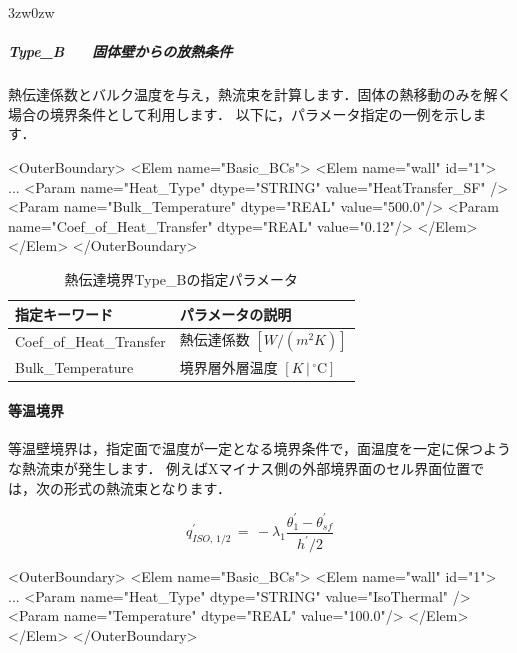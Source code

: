 \begin{indentation}{3zw}{0zw}
%
\subparagraph{Type\_B　　固体壁からの放熱条件}
熱伝達係数とバルク温度を与え，熱流束を計算します．固体の熱移動のみを解く場合の境界条件として利用します．
以下に，パラメータ指定の一例を示します．

{\small
\begin{program}
<OuterBoundary>
  <Elem name="Basic_BCs">
    <Elem name="wall" id="1">
      ...
      <Param name="Heat_Type"             dtype="STRING" value="HeatTransfer_SF" />
      <Param name="Bulk_Temperature"      dtype="REAL"   value="500.0"/>
      <Param name="Coef_of_Heat_Transfer" dtype="REAL"   value="0.12"/>
    </Elem>
  </Elem>
</OuterBoundary>
\end{program}
}

\begin{table}[htdp]
\caption{熱伝達境界Type\_Bの指定パラメータ}
\begin{center}
\small
\begin{tabular}{ll} \toprule
指定キーワード & パラメータの説明\\ \midrule
Coef\_of\_Heat\_Transfer & 熱伝達係数 $[W/(m^2K)]$\\
Bulk\_Temperature & 境界層外層温度 $[K\,|\,{}^\circ\mathrm{C}]$\\
\bottomrule
\end{tabular}
\end{center}
\label{tbl:htb}
\end{table}

\end{indentation}


%
\paragraph{等温境界}

等温壁境界は，指定面で温度が一定となる境界条件で，面温度を一定に保つような熱流束が発生します．
例えばXマイナス側の外部境界面のセル界面位置では，次の形式の熱流束となります．

\begin{equation}
q^{\prime}_{ISO,\,1/2} \,=\, -\mathit{\lambda}_1 \frac{\mathit{\theta}^{\prime}_1 - \mathit{\theta}^{\prime}_{sf}} {h^{\prime}\slash{2}}
\label{eq:qiso1}
\end{equation}

{\small
\begin{program}
<OuterBoundary>
  <Elem name="Basic_BCs">
    <Elem name="wall" id="1">
      ...
      <Param name="Heat_Type"   dtype="STRING" value="IsoThermal" />
      <Param name="Temperature" dtype="REAL"   value="100.0"/>
    </Elem>
  </Elem>
</OuterBoundary>
\end{program}
}

